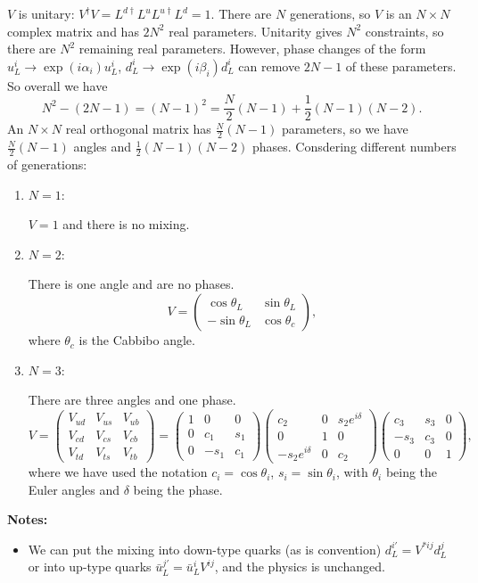 $V$ is unitary: $V^\dagger V = L^{d \dagger}L^u L^{u \dagger} L^d = 1$. There are $N$ generations, so $V$ is an $N\times N$ complex matrix and has $2N^2$ real parameters. Unitarity gives $N^2$ constraints, so there are $N^2$ remaining real parameters. However, phase changes of the form $u_L^i \to \exp(i\alpha_i)u_L^i$, $d_L^i \to \exp(i\beta_i)d_L^i$ can remove $ 2N-1$ of these parameters. So overall we have 
\begin{equation}
N^2 - (2N-1) = (N-1)^2 = \frac{N}{2}(N-1) + \frac{1}{2}(N-1)(N-2).
\end{equation}
An $N\times N$ real orthogonal matrix has $\frac{N}{2}(N-1)$ parameters, so we have $\frac{N}{2}(N-1)$ angles and $\frac{1}{2}(N-1)(N-2)$ phases. Consdering different numbers of generations:
\begin{enumerate}
\item $N=1$:

$V=1$ and there is no mixing.
\item $N=2$:

There is one angle and are no phases.
\begin{equation}
V = \begin{pmatrix}
\cos\theta_L & \sin\theta_L \\
-\sin\theta_L & \cos\theta_c
\end{pmatrix},
\end{equation}
where $\theta_c$ is the Cabbibo angle.
\item $N=3$:

There are three angles and one phase.
\begin{equation}
V = \begin{pmatrix}
V_{ud} & V_{us} & V_{ub} \\
V_{cd} & V_{cs} & V_{cb} \\
V_{td} & V_{ts} & V_{tb} 
\end{pmatrix} =
\begin{pmatrix}
1 & 0 & 0 \\
0 & c_1 & s_1 \\
0 & -s_1 & c_1 
\end{pmatrix}
\begin{pmatrix}
c_2 & 0 & s_2e^{i\delta} \\
0 & 1 & 0 \\
-s_2 e^{i\delta} & 0 & c_2
\end{pmatrix}
\begin{pmatrix}
c_3 & s_3 & 0 \\
-s_3 & c_3 & 0 \\
0 & 0 & 1
\end{pmatrix},
\end{equation}
where we have used the notation $c_i = \cos\theta_i$, $s_i = \sin\theta_i$, with $\theta_i$ being the Euler angles and $\delta$ being the phase.
\end{enumerate}
\textbf{Notes: }
\begin{itemize}
\item We can put the mixing into down-type quarks (as is convention) $d_L^{i \prime} = V^{* ij} d_L^j$ or into up-type quarks $\bar{u}_L^{j \prime} = \bar{u}_L^iV^{ij}$, and the physics is unchanged.
\end{itemize}